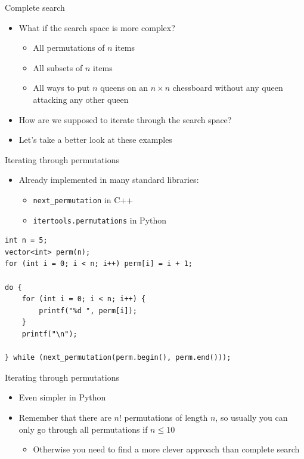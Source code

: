 \documentclass{beamer}
\begin{document}
\begin{frame}[plain]{Complete search}
    \begin{itemize}
        \item What if the search space is more complex?
            \begin{itemize}
                \item All permutations of $n$ items
                \item All subsets of $n$ items
                \item All ways to put $n$ queens on an $n\times n$ chessboard without any queen attacking any other queen
            \end{itemize}
        \item How are we supposed to iterate through the search space?
        \item Let's take a better look at these examples
    \end{itemize}
\end{frame}

\begin{frame}{Iterating through permutations}
    \begin{itemize}
        \item Already implemented in many standard libraries:
            \begin{itemize}
                \item \texttt{next\_{}permutation} in C++
                \item \texttt{itertools.permutations} in Python
            \end{itemize}
    \end{itemize}

            \begin{verbatim}
int n = 5;
vector<int> perm(n);
for (int i = 0; i < n; i++) perm[i] = i + 1;

do {
    for (int i = 0; i < n; i++) {
        printf("%d ", perm[i]);
    }
    printf("\n");

} while (next_permutation(perm.begin(), perm.end()));
            \end{verbatim}

\end{frame}

\begin{frame}[plain]{Iterating through permutations}
    \begin{itemize}
        \item Even simpler in Python
        \vspace{20pt}
        \item Remember that there are $n!$ permutations of length $n$, so usually you can only go through all permutations if $n \leq 10$
            \begin{itemize}
                \item Otherwise you need to find a more clever approach than complete search
            \end{itemize}
            \vspace{20pt}
    \end{itemize}
\end{frame}
\end{document}
